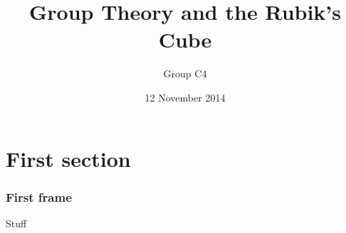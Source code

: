 \documentclass{beamer}
\title[Group Theory and the Rubik's Cube]{Group Theory and the Rubik's Cube}
\author{Group C4}
\date{12 November 2014}
\begin{document}
\section{First section}
\begin{frame}
\frametitle{First frame}
Stuff
\end{frame}
\end{document}
